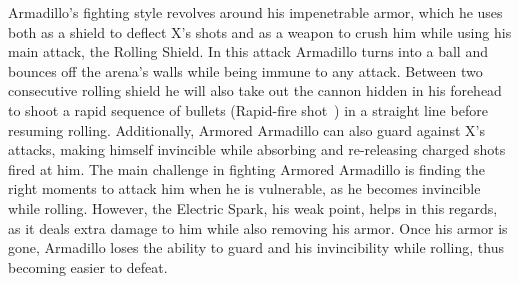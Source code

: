 Armadillo's fighting style revolves around his impenetrable armor, which he uses both as a shield to deflect X's shots and as a weapon to crush him while using his main attack, the Rolling Shield. In this attack Armadillo turns into a ball and bounces off the arena's walls while being immune to any attack. Between two consecutive rolling shield he will also take out the cannon hidden in his forehead to shoot a rapid sequence of bullets (Rapid-fire shot~\cite{book:Compendium}) in a straight line before resuming rolling. Additionally, Armored Armadillo can also guard against X's attacks, making himself invincible while absorbing and re-releasing charged shots fired at him.
The main challenge in fighting Armored Armadillo is finding the right moments to attack him when he is vulnerable, as he becomes invincible while rolling. However, the Electric Spark, his weak point, helps in this regards, as it deals extra damage to him while also removing his armor. Once his armor is gone, Armadillo loses the ability to guard and his invincibility while rolling, thus becoming easier to defeat.
